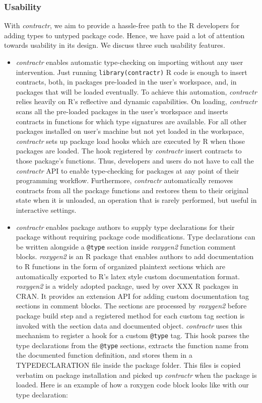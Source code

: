 \documentclass[acmsmall,review,anonymous]{acmart}\settopmatter{printfolios=true,printccs=false,printacmref=false}
\newcommand{\code}[1]{{\lstinline[style=Rin]!#1!}\xspace}
\newcommand{\contractr}{\emph{contractr}\xspace} %
\newcommand{\roxygen}{\emph{roxygen2}\xspace} %
\begin{document}
\subsubsection{Usability}
With \contractr, we aim to provide a hassle-free path to the R developers for
adding types to untyped package code. Hence, we have paid a lot of attention
towards usability in its design. We discuss three such usability features.
\begin{itemize}

\item \contractr enables automatic type-checking on importing without
  any user intervention. Just running \code{library(contractr)} R code is enough
  to insert contracts, both, in packages pre-loaded in the user's workspace, and,
  in packages that will be loaded eventually. To achieve this automation,
  \contractr relies heavily on R's reflective and dynamic capabilities. On
  loading, \contractr scans all the pre-loaded packages in the user's workspace
  and inserts contracts in functions for which type signatures are available. For
  all other packages installed on user's machine but not yet loaded in the
  workspace, \contractr sets up package load hooks which are executed by R when
  those packages are loaded. The hook registered by \contractr insert contracts to
  those package's functions. Thus, developers and users do not have to call the
  \contractr API to enable type-checking for packages at any point of their
  programming workflow. Furthermore, \contractr automatically removes contracts
  from all the package functions and restores them to their original state when it
  is unloaded, an operation that is rarely performed, but useful in interactive
  settings.

\item \contractr enables package authors to supply type declarations for their
  package without requiring package code modifications. Type declarations can be
  written alongside a \code{@type} section inside \roxygen function comment
  blocks. \roxygen is an R package that enables authors to add documentation to
  R functions in the form of organized plaintext sections which are
  automatically exported to R's latex style custom documentation format.
  \roxygen is a widely adopted package, used by over XXX R packages in CRAN. It
  provides an extension API for adding custom documentation tag sections in
  comment blocks. The sections are processed by \roxygen before package build
  step and a registered method for each custom tag section is invoked with the
  section data and documented object. \contractr uses this mechanism to register
  a hook for a custom \code{@type} tag. This hook parses the type declarations
  from the \code{@type} sections, extracts the function name from the documented
  function definition, and stores them in a TYPEDECLARATION file inside the
  package folder. This files is copied verbatim on package installation and
  picked up \contractr when the package is loaded. Here is an example of how a
  roxygen code block looks like with our type declaration:


\end{itemize}
\end{document}
